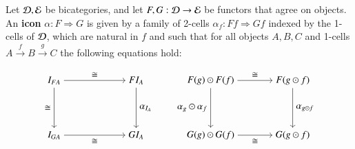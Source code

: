 \begin{defn}
Let $\mathcal{D}, \mathcal{E}$ be bicategories, and let $F,G: \mathcal{D} \rightarrow \mathcal{E}$ be functors that agree on objects. An \textbf{icon} $\alpha: F \Rightarrow G$ is given by a family of 2-cells $\alpha_f : Ff \Rightarrow Gf$ indexed by the 1-cells of $\mathcal{D}$, which are natural in $f$ and such that for all objects $A, B, C$ and 1-cells $A \xrightarrow{f} B \xrightarrow{g} C$ the following equations hold:

\begin{equation}\label{eq:iconeq}
\begin{aligned}
\begin{tikzpicture}[yscale=2,xscale=3]
\node (tl) at (0,1) {$I_{FA}$};
\node (tr) at (1,1) {$F I_A$};
\node (bl) at (0,0) {$I_{GA}$};
\node (br) at (1,0) {$GI_A$};
\draw[->] (tl) to node[above]{$\iso$} (tr);
\draw[->] (bl) to node[below]{$\iso$} (br);
\draw[->] (tl) to node[left]{$\iso$} (bl);
\draw[->] (tr) to node[right]{$\alpha_{I_A}$} (br);
\end{tikzpicture}
\end{aligned}
\qquad
\begin{aligned}\begin{tikzpicture}[yscale=2, xscale=3]
\node (tl) at (0,1) {$F(g) \odot F(f)$};
\node (tr) at (1,1) {$F(g \odot f)$};
\node (bl) at (0,0) {$G(g) \odot G(f)$};
\node (br) at (1,0) {$G(g \odot f)$};
\draw[->] (tl) to node[above]{$\iso$} (tr);
\draw[->] (bl) to node[below]{$\iso$} (br);
\draw[->] (tl) to node[left]{$\alpha_g \odot \alpha_f$}(bl);
\draw[->] (tr) to node[right]{$\alpha_{g \odot f}$} (br);
\end{tikzpicture}
\end{aligned}
\end{equation}
\end{defn}


